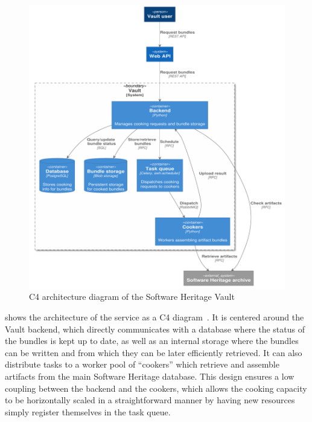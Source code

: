 %     

\begin{figure}
  \centering
  \includegraphics[width=\linewidth]{img/vault/arch-container}
  \caption{C4 architecture diagram of the Software Heritage Vault}%
  \label{fig:vault-arch}
\end{figure}

 shows the architecture of the service as a C4
diagram~\cite{brown2018c4}. It is centered
around the Vault backend, which directly communicates with a database where the
status of the bundles is kept up to date, as well as an internal storage where
the bundles can be written and from which they can be later efficiently
retrieved. It can also distribute tasks to a worker pool of ``cookers'' which
retrieve and assemble artifacts from the main Software Heritage database.  This
design ensures a low coupling between the backend and the cookers, which allows
the cooking capacity to be horizontally scaled in a straightforward manner by
having new resources simply register themselves in the task queue.

